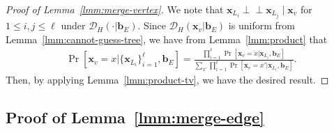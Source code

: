 \documentclass[letterpaper,11pt]{article}
\newcommand{\cald}{\mathcal{D}}
\newcommand{\bfx}{\mathbf{x}}
\newcommand{\bfb}{\mathbf{b}}
\newcommand{\ci}{\perp\!\!\!\perp}
\begin{document}
\begin{proof}[Proof of Lemma~\ref{lmm:merge-vertex}]
  We note that $\bfx_{L_i} \ci \bfx_{L_j} \mid \bfx_v$ for $1\leq i,j\leq \ell$ under $\cald_H(\cdot|\bfb_E)$.
  Since $\cald_H(\bfx_v|\bfb_E)$ is uniform from Lemma~\ref{lmm:cannot-guess-tree},
  we have from Lemma~\ref{lmm:product} that
  \begin{eqnarray*}
    \Pr[\bfx_v=x|\{\bfx_{L_i} \}_{i=1}^\ell,\bfb_E]=\frac{\prod_{i=1}^\ell\Pr[\bfx_v=x|\bfx_{L_i},\bfb_E]}{\sum_{x'}\prod_{i=1}^\ell\Pr[\bfx_v=x'|\bfx_{L_i},\bfb_E]}.
  \end{eqnarray*}
  Then, by applying Lemma~\ref{lmm:product-tv}, we have the desired result.
\end{proof}

\subsection{Proof of Lemma~\ref{lmm:merge-edge}}\label{apx:merge-edge}
\end{document}

